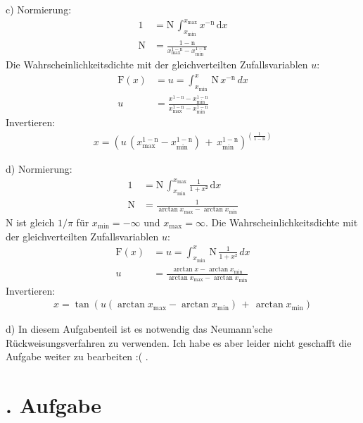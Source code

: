\documentclass[
  bibliography=totoc,     %
  captions=tableheading,  %
  titlepage=firstiscover, %
]{scrartcl}
\begin{document}
\noindent
c) Normierung:
\begin{align*}
  1 &= \mathup{N}\,\int_{x_{\mathup{min}}}^{x_{\mathup{max}}}x^{-\mathup{n}}\,\mathup{d}x\\
  \mathup{N} &= \frac{1-\mathup{n}}{x_\mathup{max}^{1-\mathup{n}}-x_\mathup{min}^{1-\mathup{n}}}
\end{align*}
Die Wahrscheinlichkeitsdichte mit der gleichverteilten Zufallsvariablen $u$:
\begin{align*}
  \mathup{F}(x) &= u = \int_{x_{\mathup{min}}}^{x}\,\mathup{N}\,x^{-\mathup{n}}\,{d}x \\
  u &= \frac{x^{1-\mathup{n}}-x_\mathup{min}^{1-\mathup{n}}}{x_\mathup{max}^{1-\mathup{n}}-x_\mathup{min}^{1-\mathup{n}}}
\end{align*}
Invertieren:
\begin{align*}
  x = (u\,(x_\mathup{max}^{1-\mathup{n}}-x_\mathup{min}^{1-\mathup{n}})\,+\,x_{\mathup{min}}^{1-\mathup{n}})^{(\frac{1}{1-\mathup{n}})}
\end{align*}

\noindent
d) Normierung:
\begin{align*}
  1 &= \mathup{N}\,\int_{x_{\mathup{min}}}^{x_{\mathup{max}}}\frac{1}{1+x²}\,\mathup{d}x\\
  \mathup{N} &= \frac{1}{\arctan{x_\mathup{max}}-\arctan{x_\mathup{min}}}
\end{align*}
N ist gleich $1/\pi$ für $x_\mathup{min} = -\infty$ und $x_\mathup{max} = \infty$.
Die Wahrscheinlichkeitsdichte mit der gleichverteilten Zufallsvariablen $u$:
\begin{align*}
  \mathup{F}(x) &= u = \int_{x_{\mathup{min}}}^{x}\,\mathup{N}\,\frac{1}{1+x²}\,{d}x \\
  u &= \frac{\arctan{x}-\arctan{x_\mathup{min}}}{\arctan{x_\mathup{max}}-\arctan{x_\mathup{min}}}
\end{align*}
Invertieren:
\begin{align*}
  x =  \tan{(u(\arctan{x_\mathup{max}}-\arctan{x_\mathup{min}})\,+\,\arctan{x_\mathup{min}})}
\end{align*}

\noindent
d) In diesem Aufgabenteil ist es notwendig das Neumann'sche Rückweisungsverfahren zu verwenden.
Ich habe es aber leider nicht geschafft die Aufgabe weiter zu bearbeiten :( .

\section{. Aufgabe}
\end{document}
